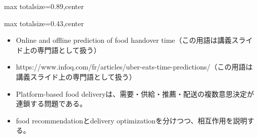 \begin{minipage}[t]{0.58\textwidth}
\begin{adjustbox}{max totalsize={\textwidth}{0.89\textheight},center}
\begin{minipage}{\textwidth}
\end{minipage}
\end{adjustbox}
\end{minipage}


\clearpage
{}
\begin{minipage}[t]{0.405\textwidth}
\begin{adjustbox}{max totalsize={\textwidth}{0.43\textheight},center}
\begin{minipage}{\textwidth}\scriptsize
{}\begin{itemize}
\item Online and offline prediction of food handover time（この用語は講義スライド上の専門語として扱う）
\item https://www.infoq.com/fr/articles/uber-eats-time-predictions/（この用語は講義スライド上の専門語として扱う）
\end{itemize}\begin{itemize}
\item Platform-based food deliveryは、需要・供給・推薦・配送の複数意思決定が連鎖する問題である。
\item food recommendationとdelivery optimizationを分けつつ、相互作用を説明する。
\end{itemize}
\end{minipage}
\end{adjustbox}
\end{minipage}\hfill

